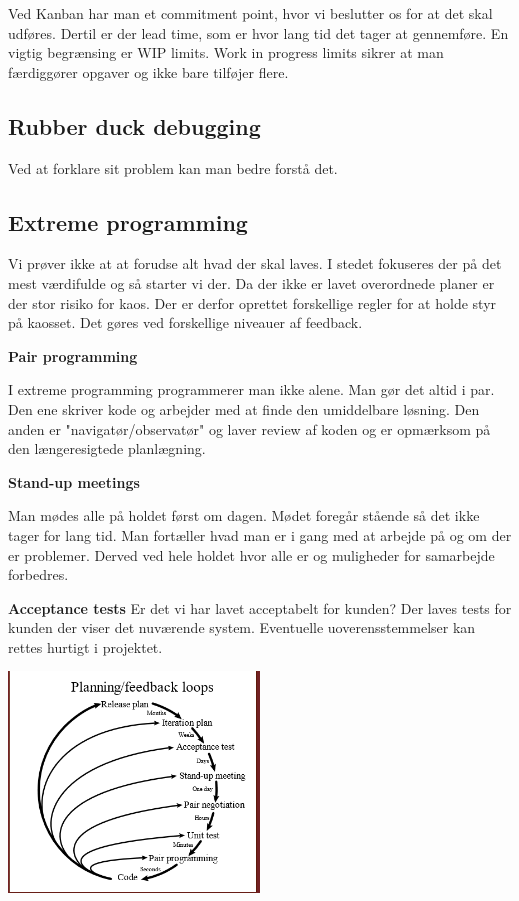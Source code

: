 Ved Kanban har man et commitment point, hvor vi beslutter os for at det skal udføres.
Dertil er der lead time, som er hvor lang tid det tager at gennemføre. En vigtig begrænsing er  WIP limits.
Work in progress limits sikrer at man færdiggører opgaver og ikke bare tilføjer flere.


\subsection{Rubber duck debugging}
Ved at forklare sit problem kan man bedre forstå det.

\subsection{Extreme programming}
Vi prøver ikke at at forudse alt hvad der skal laves. I stedet fokuseres
der på det mest værdifulde og så starter vi der. Da der ikke er lavet
overordnede planer er der stor risiko for kaos. Der er derfor oprettet
forskellige regler for at holde styr på kaosset. Det gøres ved forskellige
niveauer af feedback.

\textbf{Pair programming}

I extreme programming programmerer man ikke alene. Man gør det altid i par.
Den ene skriver kode og arbejder med at finde den umiddelbare løsning.
Den anden er "navigatør/observatør" og laver review af koden og er
opmærksom på den længeresigtede planlægning.

\textbf{Stand-up meetings}

Man mødes alle på holdet først om dagen. Mødet foregår stående så det
ikke tager for lang tid. Man fortæller hvad man er i gang med at arbejde på
og om der er problemer. Derved ved hele holdet hvor alle er og muligheder
for samarbejde forbedres.

\textbf{Acceptance tests}
Er det vi har lavet acceptabelt for kunden? Der laves tests for kunden
der viser det nuværende system. Eventuelle uoverensstemmelser kan rettes
hurtigt i projektet.


\begin{center}
	\includegraphics[width=0.5\textwidth]{Images/extreme.png}
\end{center}


